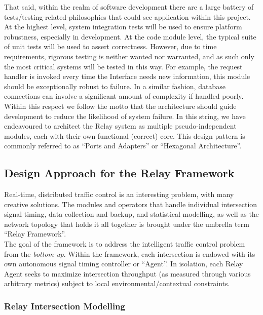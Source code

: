 \documentclass{article}
\begin{document}
That said, within the realm of software development there are a large battery of tests/testing-related-philosophies that could see application within this project.
At the highest level, system integration tests will be used to ensure platform robustness, especially in development.
At the code module level, the typical suite of unit tests will be used to assert correctness.
However, due to time requirements, rigorous testing is neither wanted nor warranted, and as such only the most critical systems will be tested in this way.
For example, the request handler is invoked every time the Interface needs new information, this module should be exceptionally robust to failure.
In a similar fashion, database connections can involve a significant amount of complexity if handled poorly.
Within this respect we follow the motto that the architecture should guide development to reduce the likelihood of system failure.
In this string, we have endeavoured to architect the Relay system as multiple pseudo-independent modules, each with their own functional (correct) core.
This design pattern is commonly referred to as ``Ports and Adapters'' or ``Hexagonal Architecture''.\\

\subsection{Design Approach for the Relay Framework}

Real-time, distributed traffic control is an interesting problem, with many creative solutions.
The modules and operators that handle individual intersection signal timing, data collection and backup, and statistical modelling, as well as the network topology that holds it all together is brought under the umbrella term ``Relay Framework''.\\

The goal of the framework is to address the intelligent traffic control problem from the \emph{bottom-up}.
Within the framework, each intersection is endowed with its own autonomous signal timing controller or ``Agent''.
In isolation, each Relay Agent seeks to maximize intersection throughput (as measured through various arbitrary metrics) subject to local environmental/contextual constraints.\\

\subsubsection{Relay Intersection Modelling}
\end{document}

